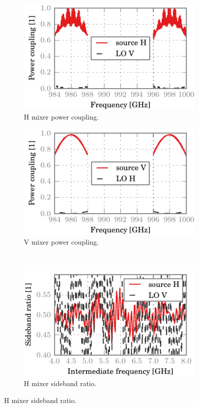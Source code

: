 \begin{figure}[hbtp]
    \centering
    \begin{subfigure}[b]{.5\textwidth}
        \includegraphics{chapter_3/14_hbb_h_dsb}%
        \caption{H mixer power coupling.}
    \end{subfigure}%
    \begin{subfigure}[b]{.5\textwidth}
        \includegraphics{chapter_3/14_hbb_v_dsb}%
        \caption{V mixer power coupling.}
    \end{subfigure}%
    \\
    \begin{subfigure}[b]{.5\textwidth}
        \includegraphics{chapter_3/14_hbb_h_sbr}%
        \caption{H mixer sideband ratio.}
    \end{subfigure}%

\end{figure}
